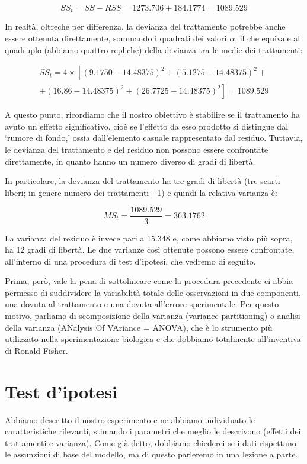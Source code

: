 \documentclass[a4paper,12pt,oneside]{book}
\begin{document}
\[SS_t = SS - RSS = 1273.706 + 184.1774 = 1089.529\]

In realtà, oltreché per differenza, la devianza del trattamento potrebbe anche essere ottenuta direttamente, sommando i quadrati dei valori \(\alpha\), il che equivale al quadruplo (abbiamo quattro repliche) della devianza tra le medie dei trattamenti:

\[{\begin{array}{l}
SS_t = 4 \times \left[ \left(9.1750 - 14.48375\right)^2 
+ \left(5.1275 - 14.48375\right)^2 + \right. \\
+ \left. \left(16.86 - 14.48375\right)^2 + \left(26.7725 - 14.48375\right)^2 \right] = 1089.529
\end{array}}\]

A questo punto, ricordiamo che il nostro obiettivo è stabilire se il trattamento ha avuto un effetto significativo, cioè se l'effetto da esso prodotto si distingue dal `rumore di fondo,' ossia dall'elemento casuale rappresentato dal residuo. Tuttavia, le devianza del trattamento e del residuo non possono essere confrontate direttamente, in quanto hanno un numero diverso di gradi di libertà.

In particolare, la devianza del trattamento ha tre gradi di libertà (tre scarti liberi; in genere numero dei trattamenti - 1) e quindi la relativa varianza è:

\[MS_t = \frac{1089.529}{3} = 363.1762\]

La varianza del residuo è invece pari a 15.348 e, come abbiamo visto più sopra, ha 12 gradi di libertà. Le due varianze così ottenute possono essere confrontate, all'interno di una procedura di test d'ipotesi, che vedremo di seguito.

Prima, però, vale la pena di sottolineare come la procedura precedente ci abbia permesso di suddividere la variabilità totale delle osservazioni in due componenti, una dovuta al trattamento e una dovuta all'errore sperimentale. Per questo motivo, parliamo di scomposizione della varianza (variance partitioning) o analisi della varianza (ANalysis Of VAriance = ANOVA), che è lo strumento più utilizzato nella sperimentazione biologica e che dobbiamo totalmente all'inventiva di Ronald Fisher.

\hypertarget{test-dipotesi}{%
\section{Test d'ipotesi}\label{test-dipotesi}}

Abbiamo descritto il nostro esperimento e ne abbiamo individuato le caratteristiche rilevanti, stimando i parametri che meglio le descrivono (effetti dei trattamenti e varianza). Come già detto, dobbiamo chiederci se i dati rispettano le assunzioni di base del modello, ma di questo parleremo in una lezione a parte.
\end{document}
